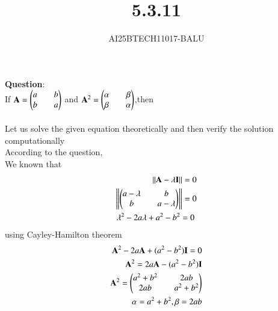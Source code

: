 \documentclass[journal]{IEEEtran}
\begin{document}

\vspace{3cm}
\title{5.3.11}
\author{AI25BTECH11017-BALU}
 \maketitle
{\let\newpage\relax\maketitle}
\renewcommand{\thefigure}{\theenumi}
\renewcommand{\thetable}{\theenumi}
\setlength{\intextsep}{10pt} %
\renewcommand{\thetable}{\theenumi}
\textbf{Question}:\\
If $\mathbf{A}=\begin{pmatrix}a&&b\\b&&a\end{pmatrix}$ and $\mathbf{A}^2=\begin{pmatrix}\alpha&&\beta\\\beta&&\alpha\end{pmatrix}$,then
\\
\solution \\
Let us solve the given equation theoretically and then verify the solution computationally \\
According to the question, \\
We known that\\
\begin{align}
    \|\mathbf{A}-\lambda\mathbf{I}\|=0\\
    \left\|\begin{pmatrix}a-\lambda&&b\\b&&a-\lambda\end{pmatrix}\right\|=0\\
    \lambda^2-2a\lambda+a^2-b^2=0\
\end{align}
using Cayley-Hamilton theorem
\begin{align}
    \mathbf{A}^2-2a\mathbf{A}+(a^2-b^2)\mathbf{I}=0\\
    \mathbf{A}^2=2a\mathbf{A}-(a^2-b^2)\mathbf{I}\\
    \mathbf{A}^2=\begin{pmatrix}a^2+b^2&&2ab\\2ab&&a^2+b^2\end{pmatrix}\\
    \alpha=a^2+b^2,\beta=2ab
\end{align}
\end{document}
